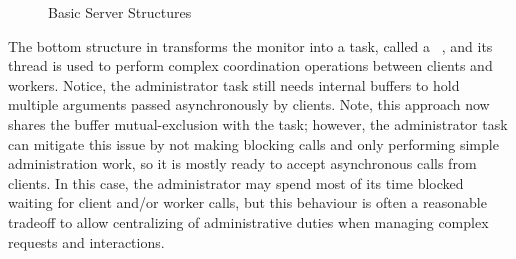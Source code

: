 \documentclass[openright,twoside]{report}
\begin{document}
\begin{figure}
\centering

\caption{Basic Server Structures}
\label{f:BasicServerStructures}
\end{figure}

The bottom structure in  transforms the monitor into a task, called a ~\cite{Gentleman81}, and its thread is used to perform complex coordination operations between clients and workers.
Notice, the administrator task still needs internal buffers to hold multiple arguments passed asynchronously by clients.
Note, this approach now shares the buffer mutual-exclusion with the task;
however, the administrator task can mitigate this issue by not making blocking calls and only performing simple administration work, so it is mostly ready to accept asynchronous calls from clients.
In this case, the administrator may spend most of its time blocked waiting for client and/or worker calls, but this behaviour is often a reasonable tradeoff to allow centralizing of administrative duties when managing complex requests and interactions.
\end{document}
